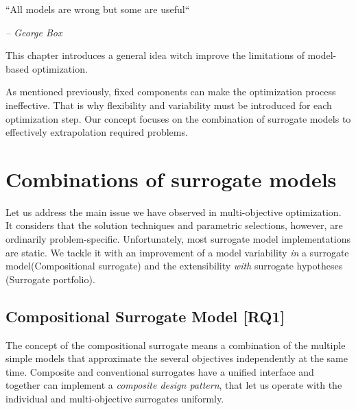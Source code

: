 
    \epigraph{``All models are wrong but some are useful``}{\textit{– George Box}}

    This chapter introduces a general idea witch improve the limitations of model-based optimization.  

    As mentioned previously, fixed components can make the optimization process ineffective. That is why flexibility and variability must be introduced for each optimization step. Our concept focuses on the combination of surrogate models to effectively extrapolation required problems.





    \section{Combinations of surrogate models}

        Let us address the main issue we have observed in multi-objective optimization. It considers that the solution techniques and parametric selections, however, are ordinarily problem-specific. Unfortunately, most surrogate model implementations are static. We tackle it with an improvement of a model variability \emph{in} a surrogate model(Compositional surrogate) and the extensibility \emph{with} surrogate hypotheses (Surrogate portfolio).

        \subsection{Compositional Surrogate Model [RQ1]}
            The concept of the compositional surrogate means a combination of the multiple simple models that approximate the several objectives independently at the same time. Composite and conventional surrogates have a unified interface and together can implement a \emph{composite design pattern}, that let us operate with the individual and multi-objective surrogates uniformly. 


